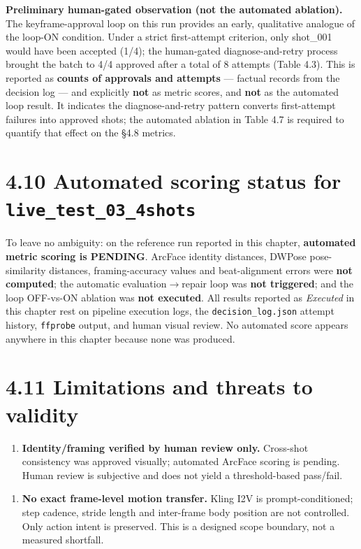 \documentclass[10pt,twocolumn,letterpaper]{article}
\begin{document}
\textbf{Preliminary human-gated observation (not the automated ablation).} The keyframe-approval loop on this run provides an early, qualitative analogue of the loop-ON condition. Under a strict first-attempt criterion, only shot\_001 would have been accepted (1/4); the human-gated diagnose-and-retry process brought the batch to 4/4 approved after a total of 8 attempts (Table 4.3). This is reported as \textbf{counts of approvals and attempts} --- factual records from the decision log --- and explicitly \textbf{not} as metric scores, and \textbf{not} as the automated loop result. It indicates the diagnose-and-retry pattern converts first-attempt failures into approved shots; the automated ablation in Table 4.7 is required to quantify that effect on the \S{}4.8 metrics.

\section*{4.10 Automated scoring status for \texttt{live\_test\_03\_4shots}}

To leave no ambiguity: on the reference run reported in this chapter, \textbf{automated metric scoring is PENDING}. ArcFace identity distances, DWPose pose-similarity distances, framing-accuracy values and beat-alignment errors were \textbf{not computed}; the automatic evaluation$\rightarrow$repair loop was \textbf{not triggered}; and the loop OFF-vs-ON ablation was \textbf{not executed}. All results reported as \emph{Executed} in this chapter rest on pipeline execution logs, the \texttt{decision\_log.json} attempt history, \texttt{ffprobe} output, and human visual review. No automated score appears anywhere in this chapter because none was produced.

\section*{4.11 Limitations and threats to validity}

\begin{enumerate}[leftmargin=1.4em,itemsep=1pt,topsep=2pt]

\item \textbf{Identity/framing verified by human review only.} Cross-shot consistency was approved visually; automated ArcFace scoring is pending. Human review is subjective and does not yield a threshold-based pass/fail.

\end{enumerate}

\begin{enumerate}[leftmargin=1.4em,itemsep=1pt,topsep=2pt]

\item \textbf{No exact frame-level motion transfer.} Kling I2V is prompt-conditioned; step cadence, stride length and inter-frame body position are not controlled. Only action intent is preserved. This is a designed scope boundary, not a measured shortfall.

\end{enumerate}
\end{document}
